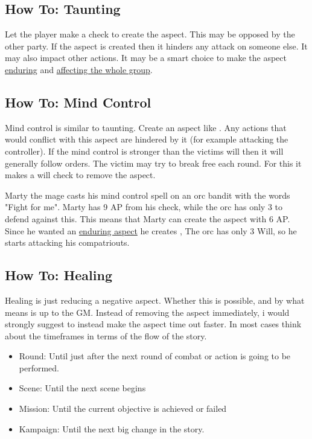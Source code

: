 \documentclass[11pt]{article}
\begin{document}
{\subsection{How To: Taunting}
\label{sec:org7ffdf94}
Let the player make a check to create the  aspect. This may be opposed by the other party. If the aspect is created then it hinders any attack on someone else. It may also impact other actions. It may be a smart choice to make the  aspect \hyperref[sec:orgcdb4f3f]{enduring} and \hyperref[sec:orgd2556ec]{affecting the whole group}. 
\subsection{How To: Mind Control}
\label{sec:org99e56ed}
Mind control is similar to taunting. Create an aspect like . Any actions that would conflict with this aspect are hindered by it (for example attacking the controller). If the mind control is stronger than the victims will then it will generally follow orders. The victim may try to break free each round. For this it makes a will check to remove the  aspect.

\begin{pwexample}
Marty the mage casts his mind control spell on an orc bandit with the words "Fight for me". Marty has 9 AP from his check, while the orc has only 3 to defend against this. This means that Marty can create the aspect with 6 AP. Since he wanted an \hyperref[sec:orgcdb4f3f]{enduring aspect} he creates , The orc has only 3 Will, so he starts attacking his compatriouts. 
\end{pwexample}
\subsection{How To: Healing}
\label{sec:org255dbba}
Healing is just reducing a negative aspect. Whether this is possible, and by what means is up to the GM. Instead of removing the aspect immediately, i would strongly suggest to instead make the aspect time out faster. In most cases think about the timeframes in terms of the flow of the story.
\begin{itemize}
\item Round: Until just after the next round of combat or action is going to be performed.
\item Scene: Until the next scene begins
\item Mission: Until the current objective is achieved or failed
\item Kampaign: Until the next big change in the story.
\end{itemize}

}
\end{document}
